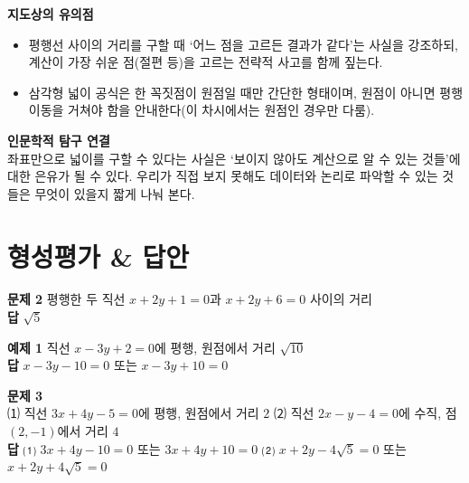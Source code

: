 \documentclass[11pt,a4paper]{article}
\begin{document}
\vspace{8pt}
\begin{minipage}[t]{0.48\linewidth}
\begin{calloutbox}
\textbf{지도상의 유의점}
\begin{itemize}[leftmargin=1.2em, itemsep=2pt, topsep=4pt]
  \item 평행선 사이의 거리를 구할 때 `어느 점을 고르든 결과가 같다'는 사실을 강조하되, 계산이 가장 쉬운 점(절편 등)을 고르는 전략적 사고를 함께 짚는다.
  \item 삼각형 넓이 공식은 한 꼭짓점이 원점일 때만 간단한 형태이며, 원점이 아니면 평행이동을 거쳐야 함을 안내한다(이 차시에서는 원점인 경우만 다룸).
\end{itemize}
\end{calloutbox}
\end{minipage}\hfill
\begin{minipage}[t]{0.48\linewidth}
\begin{notebox}
\textbf{인문학적 탐구 연결}\\
좌표만으로 넓이를 구할 수 있다는 사실은 `보이지 않아도 계산으로 알 수 있는 것들'에 대한 은유가 될 수 있다. 우리가 직접 보지 못해도 데이터와 논리로 파악할 수 있는 것들은 무엇이 있을지 짧게 나눠 본다.
\end{notebox}
\end{minipage}

\section{형성평가 \& 답안}

\begin{minipage}[t]{0.48\linewidth}
\begin{answerbox}
\textbf{문제 2} \quad 평행한 두 직선 $x+2y+1=0$과 $x+2y+6=0$ 사이의 거리\\[4pt]
\textbf{\color{goldstrong}답} \; $\sqrt{5}$
\end{answerbox}
\end{minipage}\hfill
\begin{minipage}[t]{0.48\linewidth}
\begin{answerbox}
\textbf{예제 1} \quad 직선 $x-3y+2=0$에 평행, 원점에서 거리 $\sqrt{10}$\\[4pt]
\textbf{\color{goldstrong}답} \; $x-3y-10=0$ 또는 $x-3y+10=0$
\end{answerbox}
\end{minipage}

\vspace{6pt}
\begin{answerbox}
\textbf{문제 3}\\
\small ⑴ 직선 $3x+4y-5=0$에 평행, 원점에서 거리 $2$ \qquad ⑵ 직선 $2x-y-4=0$에 수직, 점$(2,-1)$에서 거리 $4$\\[4pt]
\textbf{\color{goldstrong}답} \; ⑴ $3x+4y-10=0$ 또는 $3x+4y+10=0$ \qquad ⑵ $x+2y-4\sqrt5=0$ 또는 $x+2y+4\sqrt5=0$
\end{answerbox}
\end{document}
